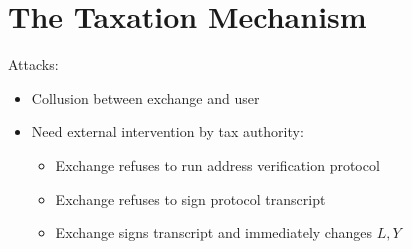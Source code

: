 \section{The Taxation Mechanism}\label{sec:taxation}

Attacks:

\begin{itemize}
    \item Collusion between exchange and user
    \item Need external intervention by tax authority:
        \begin{itemize}
            \item Exchange refuses to run address verification protocol
            \item Exchange refuses to sign protocol transcript
            \item Exchange signs transcript and immediately changes $L, Y$ 
        \end{itemize}
\end{itemize}
